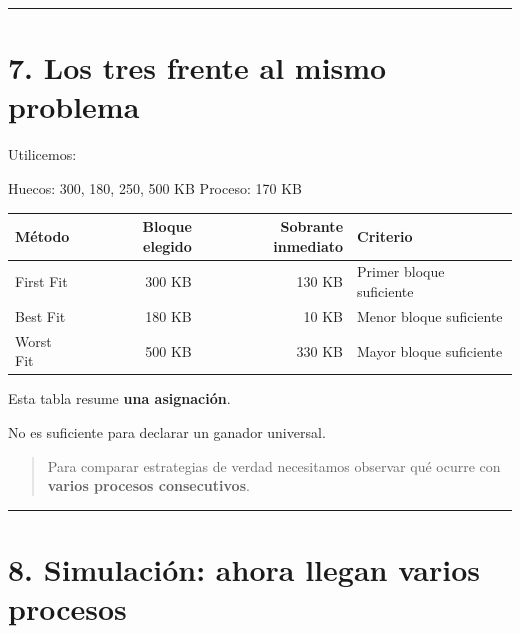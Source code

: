 \documentclass[
  spanish,
  letterpaper,
]{scrbook}
\newenvironment{Shaded}{\begin{snugshade}}{\end{snugshade}}
\newcommand{\NormalTok}[1]{\textcolor[rgb]{0.00,0.23,0.31}{#1}}
\newcounter{none} %
\begin{document}
\begin{center}\rule{0.5\linewidth}{0.5pt}\end{center}


\chapter{7. Los tres frente al mismo
problema}\label{los-tres-frente-al-mismo-problema}

Utilicemos:

\begin{Shaded}
\begin{Highlighting}[]
\NormalTok{Huecos: 300, 180, 250, 500 KB}
\NormalTok{Proceso: 170 KB}
\end{Highlighting}
\end{Shaded}

{\def\LTcaptype{none} %
\begin{longtable}[]{@{}lrrl@{}}
\toprule\noalign{}
Método & Bloque elegido & Sobrante inmediato & Criterio \\
\midrule\noalign{}
\endhead
\bottomrule\noalign{}
\endlastfoot
First Fit & 300 KB & 130 KB & Primer bloque suficiente \\
Best Fit & 180 KB & 10 KB & Menor bloque suficiente \\
Worst Fit & 500 KB & 330 KB & Mayor bloque suficiente \\
\end{longtable}
}

Esta tabla resume \textbf{una asignación}.

No es suficiente para declarar un ganador universal.

\begin{quote}
Para comparar estrategias de verdad necesitamos observar qué ocurre con
\textbf{varios procesos consecutivos}.
\end{quote}

\begin{center}\rule{0.5\linewidth}{0.5pt}\end{center}


\chapter{8. Simulación: ahora llegan varios
procesos}\label{simulaciuxf3n-ahora-llegan-varios-procesos}
\end{document}
